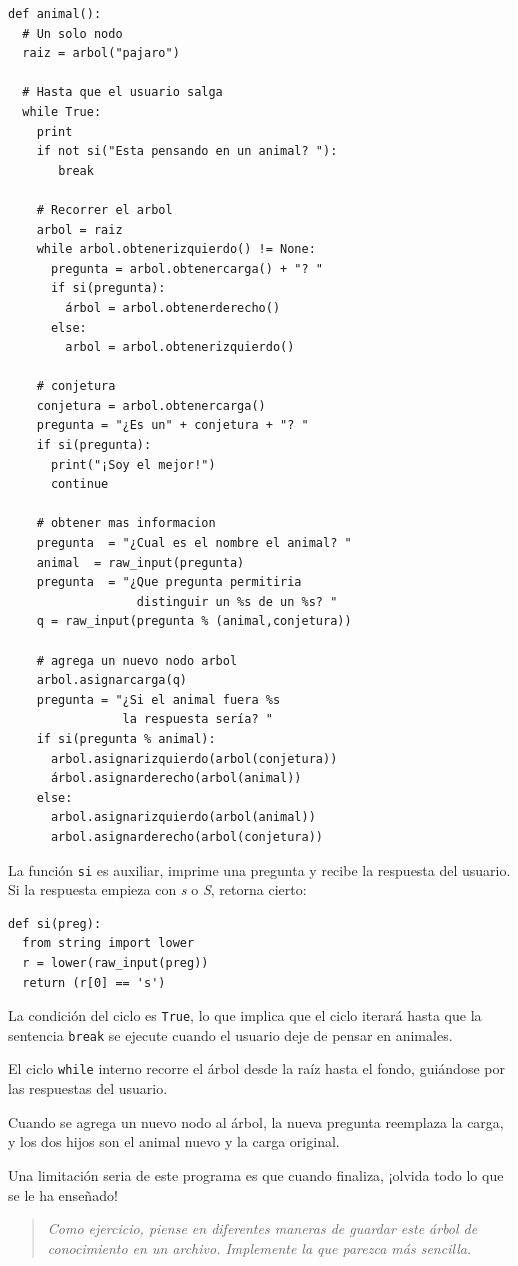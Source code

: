 \beforeverb 
\begin{verbatim}
def animal():
  # Un solo nodo
  raiz = arbol("pajaro")

  # Hasta que el usuario salga
  while True:
    print
    if not si("Esta pensando en un animal? "): 
       break

    # Recorrer el arbol
    arbol = raiz
    while arbol.obtenerizquierdo() != None:
      pregunta = arbol.obtenercarga() + "? "
      if si(pregunta):
        árbol = arbol.obtenerderecho()
      else:
        arbol = arbol.obtenerizquierdo()

    # conjetura
    conjetura = arbol.obtenercarga()
    pregunta = "¿Es un" + conjetura + "? "
    if si(pregunta):
      print("¡Soy el mejor!")
      continue

    # obtener mas informacion
    pregunta  = "¿Cual es el nombre el animal? "
    animal  = raw_input(pregunta)
    pregunta  = "¿Que pregunta permitiria 
                  distinguir un %s de un %s? "
    q = raw_input(pregunta % (animal,conjetura))

    # agrega un nuevo nodo arbol
    arbol.asignarcarga(q)
    pregunta = "¿Si el animal fuera %s 
                la respuesta sería? "
    if si(pregunta % animal):
      arbol.asignarizquierdo(arbol(conjetura))
      árbol.asignarderecho(arbol(animal))
    else:
      arbol.asignarizquierdo(arbol(animal))
      arbol.asignarderecho(arbol(conjetura))
\end{verbatim}
\afterverb La función \texttt{si} es auxiliar, imprime una pregunta
y recibe la respuesta del usuario. Si la respuesta empieza con {\em
s} o {\em S}, retorna cierto:

\beforeverb 
\begin{verbatim}
def si(preg):
  from string import lower
  r = lower(raw_input(preg))
  return (r[0] == 's')
\end{verbatim}
\afterverb La condición del ciclo es \texttt{True}, lo que implica
que el ciclo iterará hasta que la sentencia \texttt{break} se ejecute
cuando el usuario deje de pensar en animales.

El ciclo \texttt{while} interno recorre el árbol desde la raíz hasta
el fondo, guiándose por las respuestas del usuario.

Cuando se agrega un nuevo nodo al árbol, la nueva pregunta reemplaza
la carga, y los dos hijos son el animal nuevo y la carga original.

Una limitación seria de este programa es que cuando finaliza, ¡olvida
todo lo que se le ha enseñado!
\begin{quote}
{\em Como ejercicio, piense en diferentes maneras de guardar este
árbol de conocimiento en un archivo. Implemente la que parezca más
sencilla.} 
\end{quote}

